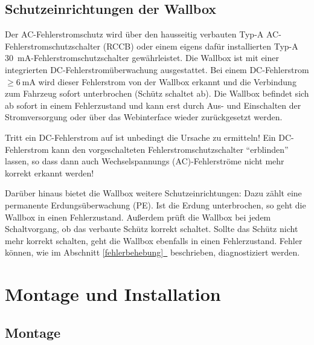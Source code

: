 \documentclass[a4paper,10pt]{article}
\newcommand{\hint}[1]{\begin{tcolorbox}[colback=boxgray,colframe=black,coltext=
white,title=Hinweis,left*=2mm,right*=2mm,boxsep=1mm,bottom=1mm,top=1mm]#1\end{tcolorbox}}
\newcommand*{\fullref}[1]{\hyperref[{#1}]{\ref*{#1}~\nameref*{#1}}}
\begin{document}
\begin{multicols*}{2}
	\subsection{Schutzeinrichtungen der Wallbox}\label{dcerrorhint}
	Der AC-Fehlerstromschutz wird über den hausseitig verbauten
	Typ-A AC-Fehlerstromschutzschalter (RCCB) oder einem eigens dafür installierten
	Typ-A \SI{30}{\milli\ampere}-Fehlerstromschutzschalter gewährleistet. Die Wallbox ist
	mit einer integrierten DC-Fehlerstromüberwachung ausgestattet.
	Bei einem DC-Fehlerstrom $\geq \SI{6}{\milli\ampere}$ wird dieser
	Fehlerstrom von der Wallbox erkannt und die Verbindung zum Fahrzeug sofort
	unterbrochen (Schütz schaltet ab). Die Wallbox befindet sich ab sofort in einem
	Fehlerzustand und kann erst durch Aus- und Einschalten der
	Stromversorgung oder über das Webinterface wieder zurückgesetzt werden.
	\hint{Tritt ein DC-Fehlerstrom auf ist unbedingt die Ursache zu
	ermitteln! Ein DC-Fehlerstrom kann den vorgeschalteten Fehlerstromschutzschalter
	\enquote{erblinden} lassen, so dass dann auch Wechselspannungs
	(AC)-Fehlerströme nicht mehr korrekt erkannt werden!}

	Darüber hinaus bietet die Wallbox weitere Schutzeinrichtungen: Dazu zählt eine
	permanente Erdungsüberwachung (PE). Ist die Erdung unterbrochen, so geht die
	Wallbox in einen Fehlerzustand. Außerdem prüft die Wallbox bei jedem
	Schaltvorgang, ob das verbaute Schütz korrekt schaltet. Sollte das
	Schütz nicht mehr korrekt schalten, geht die Wallbox ebenfalls in einen Fehlerzustand.
	Fehler können, wie im Abschnitt \fullref{fehlerbehebung} beschrieben, diagnostiziert werden.

	\newpage
	\section{Montage und Installation}
	\subsection{Montage}

\end{multicols*}
\end{document}
